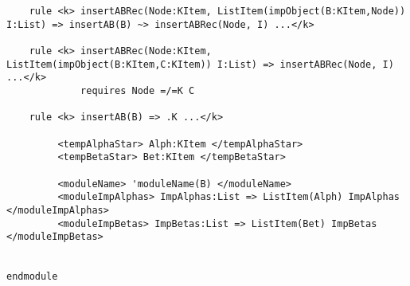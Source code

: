 \begin{lstlisting}
    rule <k> insertABRec(Node:KItem, ListItem(impObject(B:KItem,Node)) I:List) => insertAB(B) ~> insertABRec(Node, I) ...</k>

    rule <k> insertABRec(Node:KItem, ListItem(impObject(B:KItem,C:KItem)) I:List) => insertABRec(Node, I) ...</k>
             requires Node =/=K C

    rule <k> insertAB(B) => .K ...</k>

         <tempAlphaStar> Alph:KItem </tempAlphaStar>
         <tempBetaStar> Bet:KItem </tempBetaStar>

         <moduleName> 'moduleName(B) </moduleName>
         <moduleImpAlphas> ImpAlphas:List => ListItem(Alph) ImpAlphas </moduleImpAlphas>
         <moduleImpBetas> ImpBetas:List => ListItem(Bet) ImpBetas </moduleImpBetas>


endmodule
\end{lstlisting}

